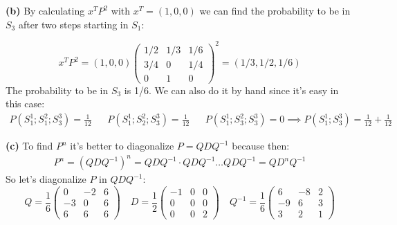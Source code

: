 \documentclass[../main.tex]{subfiles}
\begin{document}
\noindent\textbf{(b)} By calculating $x^T P^2$ with $x^T=(1, 0, 0)$ we can find the probability to be in $S_3$ after two steps starting in $S_1$:

\renewcommand\arraystretch{1.2}
\[
x^TP^2 = (1, 0, 0)\begin{pmatrix}
1/2 & 1/3 & 1/6 \\
3/4 & 0 & 1/4 \\
0 & 1 & 0
\end{pmatrix}^2 = (1/3, 1/2, 1/6)
\]
The probability to be in $S_3$ is 1/6. We can also do it by hand since it's easy in this case: 
\begin{align}
    P(S^1_1; S_1^2; S_3^3) = \frac{1}{12} && P(S^1_1; S_2^2; S_3^3) = \frac{1}{12} && P(S^1_1; S_3^2; S_3^3) = 0 \implies P(S^1_1; S^3_3) = \frac{1}{12}+\frac{1}{12}
\end{align}

\noindent \textbf{(c)} To find $P^n$ it's better to diagonalize $P = QDQ^{-1}$ because then:
\begin{align}
    P^n =  (QDQ^{-1})^n = QDQ^{-1}\cdot QDQ^{-1} \dots QDQ^{-1} = QD^nQ^{-1}
\end{align}
So let's diagonalize $P$ in $QDQ^{-1}$:
\renewcommand\arraystretch{1.2}
\[
Q = \frac{1}{6}\begin{pmatrix}
0 & -2 & 6 \\
-3 & 0 & 6 \\
6 & 6 & 6 
\end{pmatrix}
\quad
D = \frac{1}{2}\begin{pmatrix}
-1 & 0 & 0 \\
0 & 0 & 0 \\
0 & 0 & 2
\end{pmatrix}
\quad
Q^{-1} = \frac{1}{6}\begin{pmatrix}
6 & -8 & 2 \\
-9 & 6 & 3 \\
3 & 2 & 1
\end{pmatrix}
\]
\end{document}
